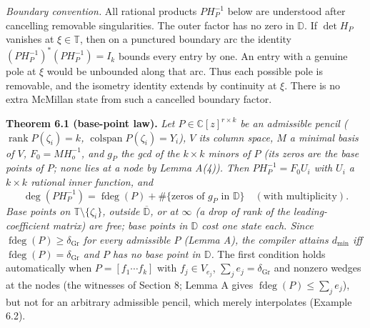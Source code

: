\documentclass[
  11pt,
  a4paper,
]{article}
\newcounter{none} %
\begin{document}
\emph{Boundary convention.} All rational products \(PH_P^{-1}\) below
are understood after cancelling removable singularities. The outer
factor has no zero in \(\mathbb D\). If \(\det H_P\) vanishes at
\(\xi\in\mathbb T\), then on a punctured boundary arc the identity
\((PH_P^{-1})^*(PH_P^{-1})=I_k\) bounds every entry by one. An entry
with a genuine pole at \(\xi\) would be unbounded along that arc. Thus
each possible pole is removable, and the isometry identity extends by
continuity at \(\xi\). There is no extra McMillan state from such a
cancelled boundary factor.

\textbf{Theorem 6.1 (base-point law).} \emph{Let
\(P\in\mathbb C[z]^{r\times k}\) be an admissible pencil
(\(\operatorname{rank}P(\zeta_i)=k\),
\(\operatorname{colspan}P(\zeta_i)=Y_i\)), \(V\) its column space, \(M\)
a minimal basis of \(V\), \(F_0=MH_o^{-1}\), and \(g_P\) the gcd of the
\(k\times k\) minors of \(P\) (its zeros are the base points of \(P\);
none lies at a node by Lemma A(4)). Then \(PH_P^{-1}=F_0U_i\) with
\(U_i\) a \(k\times k\) rational inner function, and}
\[\deg(PH_P^{-1})=\operatorname{fdeg}(P)+\#\{\text{zeros of }g_P\text{ in }\mathbb D\}\quad(\text{with multiplicity}).\]
\emph{Base points on \(\mathbb T\setminus\{\zeta_i\}\), outside
\(\overline{\mathbb D}\), or at \(\infty\) (a drop of rank of the
leading-coefficient matrix) are free; base points in \(\mathbb D\) cost
one state each. Since \(\operatorname{fdeg}(P)\ge\delta_{\mathrm{Gr}}\)
for every admissible \(P\) (Lemma A), the compiler attains \(d_{\min}\)
iff \(\operatorname{fdeg}(P)=\delta_{\mathrm{Gr}}\) and \(P\) has no
base point in \(\mathbb D\).} The first condition holds automatically
when \(P=[f_1\cdots f_k]\) with \(f_j\in V_{e_j}\),
\(\sum_je_j=\delta_{\mathrm{Gr}}\) and nonzero wedges at the nodes (the
witnesses of Section 8; Lemma A gives
\(\operatorname{fdeg}(P)\le\sum_je_j\)), but not for an arbitrary
admissible pencil, which merely interpolates (Example 6.2).
\end{document}
